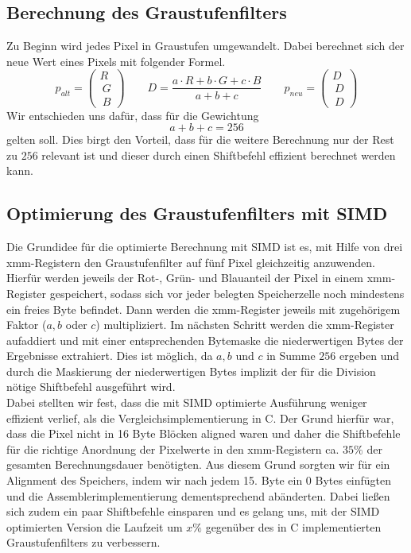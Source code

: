 \documentclass[course=erap]{aspdoc}
\begin{document}
	\subsection{Berechnung des Graustufenfilters}
	Zu Beginn wird jedes Pixel in Graustufen umgewandelt. Dabei berechnet sich der neue Wert eines Pixels mit folgender Formel.
	\begin{equation}
	\label{(2)}
	p_{alt} =  \begin{pmatrix}R \\\ G \\\ B \end{pmatrix} \qquad D = \frac{a \cdot R  + b \cdot G  + c \cdot B }{a + b + c} \qquad p_{neu} =  \begin{pmatrix}D \\\ D \\\ D \end{pmatrix}
	\end{equation}	
	Wir entschieden uns dafür, dass für die Gewichtung \begin{equation}
	a + b + c = 256
	\end{equation} gelten soll. Dies birgt den Vorteil, dass für die weitere Berechnung nur der Rest zu $256$ relevant ist und dieser durch einen Shiftbefehl effizient berechnet werden kann.
	
	\subsection{Optimierung des Graustufenfilters mit SIMD}
	Die Grundidee für die optimierte Berechnung mit SIMD ist es, mit Hilfe von drei xmm-Registern den Graustufenfilter auf fünf Pixel gleichzeitig anzuwenden. Hierfür werden jeweils der Rot-, Grün- und Blauanteil der Pixel in einem xmm-Register gespeichert, sodass sich vor jeder belegten Speicherzelle noch mindestens ein freies Byte befindet. Dann werden die xmm-Register jeweils mit zugehörigem Faktor ($a,b$ oder $c$) multipliziert. Im nächsten Schritt werden die xmm-Register aufaddiert und mit einer entsprechenden Bytemaske die niederwertigen Bytes der Ergebnisse extrahiert. Dies ist möglich, da $a,b$ und $c$ in Summe $256$ ergeben und durch die Maskierung der niederwertigen Bytes implizit der für die Division nötige Shiftbefehl ausgeführt wird.
	\\
	\newline
	\noindent
	Dabei stellten wir fest, dass die mit SIMD optimierte Ausführung weniger effizient verlief, als die Vergleichsimplementierung in C. Der Grund hierfür war, dass die Pixel nicht in 16 Byte Blöcken aligned waren und daher die Shiftbefehle für die richtige Anordnung der Pixelwerte in den xmm-Registern ca. $35\%$ der gesamten Berechnungsdauer benötigten. Aus diesem Grund sorgten wir für ein Alignment des Speichers, indem wir nach jedem 15. Byte ein 0 Bytes einfügten und die Assemblerimplementierung dementsprechend abänderten. Dabei ließen sich zudem ein paar Shiftbefehle einsparen und es gelang uns, mit der SIMD optimierten Version die Laufzeit um $x\%$ gegenüber des in C implementierten Graustufenfilters zu verbessern.  
	
\end{document}
